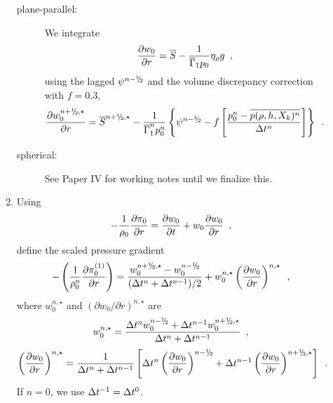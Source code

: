 \begin{description}
\begin{enumerate}
\begin{description}

\item[plane-parallel:] We integrate
\begin{equation}
\frac{\partial w_0}{\partial r} =  \overline{S} - \frac{1}{\overline{\Gamma}_1 p_0} \eta_{\rho} g 
\enskip \label{eq:divw0} ,
\end{equation}
using the lagged $\psi^{\nmh}$ and the volume discrepancy correction with $f=0.3$,
\begin{equation}
\frac{\partial w_0^{\nph,\star}}{\partial r} =  \overline{S}^{\nph,\star} 
- \frac{1}{\gammabar^{n} p_0^{n}}
\left\{ \psi^{\nmh} - 
f \left[\frac{p_0^n - \overline{p(\rho,h,X_k)^n}}{\Delta t^n} \right]\right\}
\enskip .
\end{equation}

\item[spherical:] See Paper IV for working notes until we finalize this.

\end{description}

\item Using 
\begin{equation}
- \frac{1}{\rho_0} \frac{\partial \pi_0}{\partial r} 
= \frac{\partial w_0}{\partial t} + w_0 \frac{\partial w_0}{\partial r} 
\enskip, \label{eq:pizero}
\end{equation}
define the scaled pressure gradient
\begin{equation}
-\left ( \frac{1}{\rho_0^n} \frac{\partial \pizeroone}{\partial r} \right ) = 
\frac{w_0^{\nph,\star} - w_0^\nmh}{(\dt^n+\dt^{n-1})/2} 
+  w_0^{n,\star} \left(\frac{\partial w_0}{\partial r}\right)^{n,\star} \enskip ,
\end{equation} 
where $w_0^{n,\star}$ and $(\partial w_0 / \partial r)^{n,\star}$ are
\begin{equation}
w_0^{n,\star} = \frac{\dt^{n} w_0^{\nmh} + \dt^{n-1} w_0^{\nph,\star}}{\dt^n+\dt^{n-1}} 
\enskip,\end{equation}
\begin{equation}
\left(\frac{\partial w_0}{\partial r}\right)^{n,\star} = 
\frac{1}{\dt^n+\dt^{n-1} } 
\left [ \dt^{n} \left(\frac{\partial w_0 }{ \partial r}\right)^{\nmh}
+ \dt^{n-1} \left(\frac{\partial w_0 }{ \partial r}\right)^{\nph,\star} \right ] 
\enskip.\end{equation}
If $n=0$, we use $\Delta t^{-1} = \Delta t^0$.

\end{enumerate}


\end{description}
